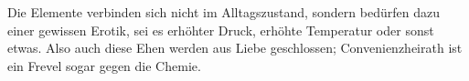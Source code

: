 Die Elemente verbinden sich nicht im Alltagszustand, sondern bedürfen dazu einer gewissen Erotik, sei es erhöhter Druck, erhöhte Temperatur oder sonst etwas. Also auch diese Ehen werden aus Liebe geschlossen; Convenienzheirath ist ein Frevel sogar gegen die Chemie.
\par

